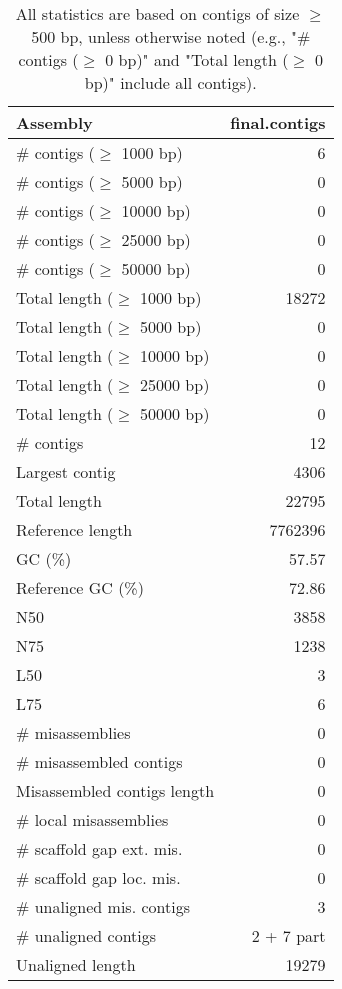 \documentclass[12pt,a4paper]{article}
\begin{document}
\begin{table}[ht]
\begin{center}
\caption{All statistics are based on contigs of size $\geq$ 500 bp, unless otherwise noted (e.g., "\# contigs ($\geq$ 0 bp)" and "Total length ($\geq$ 0 bp)" include all contigs).}
\begin{tabular}{|l*{1}{|r}|}
\hline
Assembly & final.contigs \\ \hline
\# contigs ($\geq$ 1000 bp) & 6 \\ \hline
\# contigs ($\geq$ 5000 bp) & 0 \\ \hline
\# contigs ($\geq$ 10000 bp) & 0 \\ \hline
\# contigs ($\geq$ 25000 bp) & 0 \\ \hline
\# contigs ($\geq$ 50000 bp) & 0 \\ \hline
Total length ($\geq$ 1000 bp) & 18272 \\ \hline
Total length ($\geq$ 5000 bp) & 0 \\ \hline
Total length ($\geq$ 10000 bp) & 0 \\ \hline
Total length ($\geq$ 25000 bp) & 0 \\ \hline
Total length ($\geq$ 50000 bp) & 0 \\ \hline
\# contigs & 12 \\ \hline
Largest contig & 4306 \\ \hline
Total length & 22795 \\ \hline
Reference length & 7762396 \\ \hline
GC (\%) & 57.57 \\ \hline
Reference GC (\%) & 72.86 \\ \hline
N50 & 3858 \\ \hline
N75 & 1238 \\ \hline
L50 & 3 \\ \hline
L75 & 6 \\ \hline
\# misassemblies & 0 \\ \hline
\# misassembled contigs & 0 \\ \hline
Misassembled contigs length & 0 \\ \hline
\# local misassemblies & 0 \\ \hline
\# scaffold gap ext. mis. & 0 \\ \hline
\# scaffold gap loc. mis. & 0 \\ \hline
\# unaligned mis. contigs & 3 \\ \hline
\# unaligned contigs & 2 + 7 part \\ \hline
Unaligned length & 19279 \\ \hline

\end{tabular}
\end{center}
\end{table}
\end{document}
